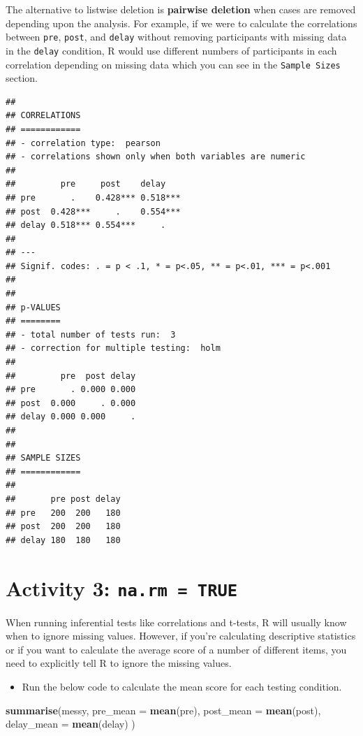\documentclass[]{book}
\newenvironment{Shaded}{\begin{snugshade}}{\end{snugshade}}
\newcommand{\DataTypeTok}[1]{\textcolor[rgb]{0.13,0.29,0.53}{#1}}
\newcommand{\KeywordTok}[1]{\textcolor[rgb]{0.13,0.29,0.53}{\textbf{#1}}}
\newcommand{\NormalTok}[1]{#1}
\providecommand{\tightlist}{%
  \setlength{\itemsep}{0pt}\setlength{\parskip}{0pt}}
\begin{document}
The alternative to listwise deletion is \textbf{pairwise deletion} when cases are removed depending upon the analysis. For example, if we were to calculate the correlations between \texttt{pre}, \texttt{post}, and \texttt{delay} without removing participants with missing data in the \texttt{delay} condition, R would use different numbers of participants in each correlation depending on missing data which you can see in the \texttt{Sample\ Sizes} section.

\begin{verbatim}
## 
## CORRELATIONS
## ============
## - correlation type:  pearson 
## - correlations shown only when both variables are numeric
## 
##         pre     post    delay   
## pre       .    0.428*** 0.518***
## post  0.428***     .    0.554***
## delay 0.518*** 0.554***     .   
## 
## ---
## Signif. codes: . = p < .1, * = p<.05, ** = p<.01, *** = p<.001
## 
## 
## p-VALUES
## ========
## - total number of tests run:  3 
## - correction for multiple testing:  holm 
## 
##         pre  post delay
## pre       . 0.000 0.000
## post  0.000     . 0.000
## delay 0.000 0.000     .
## 
## 
## SAMPLE SIZES
## ============
## 
##       pre post delay
## pre   200  200   180
## post  200  200   180
## delay 180  180   180
\end{verbatim}

\hypertarget{activity-3-na.rm-true}{%
\section{\texorpdfstring{Activity 3: \texttt{na.rm\ =\ TRUE}}{Activity 3: na.rm = TRUE}}\label{activity-3-na.rm-true}}

When running inferential tests like correlations and t-tests, R will usually know when to ignore missing values. However, if you're calculating descriptive statistics or if you want to calculate the average score of a number of different items, you need to explicitly tell R to ignore the missing values.

\begin{itemize}
\tightlist
\item
  Run the below code to calculate the mean score for each testing condition.
\end{itemize}

\begin{Shaded}
\begin{Highlighting}[]
\KeywordTok{summarise}\NormalTok{(messy, }
          \DataTypeTok{pre_mean =} \KeywordTok{mean}\NormalTok{(pre),}
          \DataTypeTok{post_mean =} \KeywordTok{mean}\NormalTok{(post),}
          \DataTypeTok{delay_mean =} \KeywordTok{mean}\NormalTok{(delay)}
\NormalTok{          )}
\end{Highlighting}
\end{Shaded}
\end{document}
